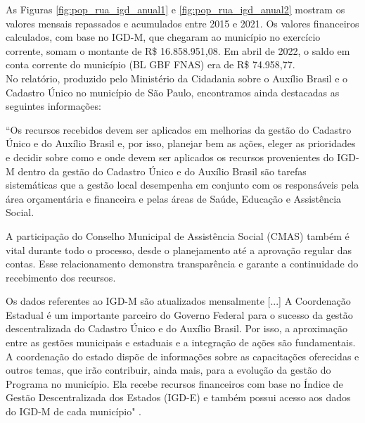 \documentclass[14pt]{extarticle}
\begin{document}
As Figuras \ref{fig:pop_rua_igd_anual1} e \ref{fig:pop_rua_igd_anual2} mostram os valores mensais repassados e acumulados entre 2015 e 2021. Os valores financeiros calculados, com base no IGD-M, que chegaram ao município no exercício corrente, somam o montante de R\$ 16.858.951,08. Em abril de 2022, o saldo em conta corrente do município (BL GBF FNAS) era de R\$ 74.958,77.\\

No relatório, produzido pelo Ministério da Cidadania sobre o Auxílio Brasil e o Cadastro Único no município de São Paulo, encontramos ainda destacadas as seguintes informações:

\vspace{-0.5cm}
\begin{trivlist}\leftskip=4cm
\begin{singlespace}
\item\small ``Os recursos recebidos devem ser aplicados em melhorias da gestão do Cadastro Único e do Auxílio Brasil e, por isso, planejar bem as ações, eleger as prioridades e decidir sobre como e onde devem ser aplicados os recursos provenientes do IGD-M dentro da gestão do Cadastro Único e do Auxílio Brasil são tarefas sistemáticas que a gestão local desempenha em conjunto com os responsáveis pela área orçamentária e financeira e pelas áreas de Saúde, Educação e Assistência Social.\\
\item\small A participação do Conselho Municipal de Assistência Social (CMAS) também é vital durante todo o processo, desde o planejamento até a aprovação regular das contas. Esse relacionamento demonstra transparência e garante a continuidade do recebimento dos recursos.\\
\item\small Os dados referentes ao IGD-M são atualizados mensalmente [...] A Coordenação Estadual é um importante parceiro do Governo Federal para o sucesso da gestão descentralizada do Cadastro Único e do Auxílio Brasil. Por isso, a aproximação entre as gestões municipais e estaduais e a integração de ações são fundamentais. A coordenação do estado dispõe de informações sobre as capacitações oferecidas e outros temas, que irão contribuir, ainda mais, para a evolução da gestão do Programa no município. Ela recebe recursos financeiros com base no Índice de Gestão Descentralizada dos Estados (IGD-E) e também possui acesso aos dados do IGD-M de cada município" \citep{igdm}.
\end{singlespace}
\end{trivlist}
\end{document}

